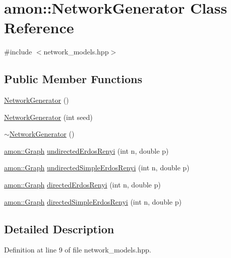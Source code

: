 \hypertarget{classamon_1_1_network_generator}{\section{amon\-:\-:Network\-Generator Class Reference}
\label{classamon_1_1_network_generator}
}


{\ttfamily \#include $<$network\-\_\-models.\-hpp$>$}

\subsection*{Public Member Functions}
\begin{DoxyCompactItemize}
\item 
\hyperlink{classamon_1_1_network_generator_ae739a560fd0303645f489245561f84f9}{Network\-Generator} ()
\item 
\hyperlink{classamon_1_1_network_generator_a8793e18217d6b0601d41c72c9a0fd5f8}{Network\-Generator} (int seed)
\item 
\hyperlink{classamon_1_1_network_generator_a8f34b3e5ffbf06be52b30373d18b0224}{$\sim$\-Network\-Generator} ()
\item 
\hyperlink{classamon_1_1_graph}{amon\-::\-Graph} \hyperlink{classamon_1_1_network_generator_ab1dca0f0df8a7f590cc93056b6c84da7}{undirected\-Erdos\-Renyi} (int n, double p)
\item 
\hyperlink{classamon_1_1_graph}{amon\-::\-Graph} \hyperlink{classamon_1_1_network_generator_ac3cffe11a9628e3ca6a78e924b92dd07}{undirected\-Simple\-Erdos\-Renyi} (int n, double p)
\item 
\hyperlink{classamon_1_1_graph}{amon\-::\-Graph} \hyperlink{classamon_1_1_network_generator_a0ca71ce45ccf355bb8737b36d5cb4c3c}{directed\-Erdos\-Renyi} (int n, double p)
\item 
\hyperlink{classamon_1_1_graph}{amon\-::\-Graph} \hyperlink{classamon_1_1_network_generator_a908bd083e8ebbf1b4597b2d8d28e439d}{directed\-Simple\-Erdos\-Renyi} (int n, double p)
\end{DoxyCompactItemize}


\subsection{Detailed Description}


Definition at line 9 of file network\-\_\-models.\-hpp.




